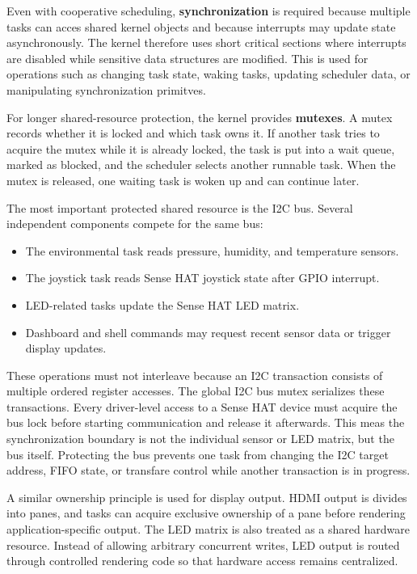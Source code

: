 Even with cooperative scheduling, \textbf{synchronization} is required because multiple tasks can acces shared kernel objects and because interrupts may update state asynchronously. The kernel therefore uses short critical sections where interrupts are disabled while sensitive data structures are modified. This is used for operations such as changing task state, waking tasks, updating scheduler data, or manipulating synchronization primitves.

For longer shared-resource protection, the kernel provides \textbf{mutexes}. A mutex records whether it is locked and which task owns it. If another task tries to acquire the mutex while it is already locked, the task is put into a wait queue, marked as blocked, and the scheduler selects another runnable task. When the mutex is released, one waiting task is woken up and can continue later.

The most important protected shared resource is the I2C bus. Several independent components compete for the same bus:

\begin{itemize}
	\item The environmental task reads pressure, humidity, and temperature sensors.
	\item The joystick task reads Sense HAT joystick state after GPIO interrupt.
	\item LED-related tasks update the Sense HAT LED matrix.
	\item Dashboard and shell commands may request recent sensor data or trigger display updates.
\end{itemize}

These operations must not interleave because an I2C transaction consists of multiple ordered register accesses. The global I2C bus mutex serializes these transactions. Every driver-level access to a Sense HAT device must acquire the bus lock before starting communication and release it afterwards. This meas the synchronization boundary is not the individual sensor or LED matrix, but the bus itself. Protecting the bus prevents one task from changing the I2C target address, FIFO state, or transfare control while another transaction is in progress.

A similar ownership principle is used for display output. HDMI output is divides into panes, and tasks can acquire exclusive ownership of a pane before rendering application-specific output. The LED matrix is also treated as a shared hardware resource. Instead of allowing arbitrary concurrent writes, LED output is routed through controlled rendering code so that hardware access remains centralized.

